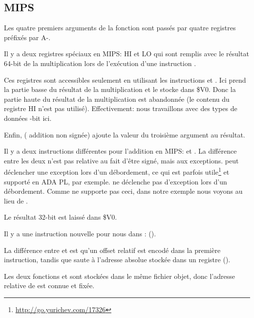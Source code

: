 ﻿\subsection{MIPS}



Les quatre premiers arguments de la fonction sont passés par quatre registres préfixés
par A-.


Il y a deux registres spéciaux en MIPS: HI et LO qui sont remplis avec le résultat
64-bit de la multiplication lors de l'exécution d'une instruction .

Ces registres sont accessibles seulement en utilisant les instructions  et .
Ici  prend la partie basse du résultat de la multiplication et le stocke
dans \$V0.
Donc la partie haute du résultat de la multiplication est abandonnée (le contenu
du registre HI n'est pas utilisé).
Effectivement: nous travaillons avec des types de données -bit ici.


Enfin,  ( addition non signée) ajoute la valeur du troisième
argument au résultat.


Il y a deux instructions différentes pour l'addition en MIPS:  et .
La différence entre les deux n'est pas relative au fait d'être signé, mais aux
exceptions.  peut déclencher une exception lors d'un débordement, ce qui
est parfois utile\footnote{\url{http://go.yurichev.com/17326}} et supporté en ADA
\ac{PL}, par exemple.
 ne déclenche pas d'exception lors d'un débordement.
Comme \CCpp ne supporte pas ceci, dans notre exemple nous voyons  au lieu
de .

Le résultat 32-bit est laissé dans \$V0.


Il y a une instruction nouvelle pour nous dans \main:  ().

La différence entre  et  est qu'un offset relatif est encodé
dans la première instruction, tandis que  saute à l'adresse absolue stockée
dans un registre ().

Les deux fonctions \ttf et \main sont stockées dans le même fichier objet, donc
l'adresse relative de \ttf est connue et fixée.
